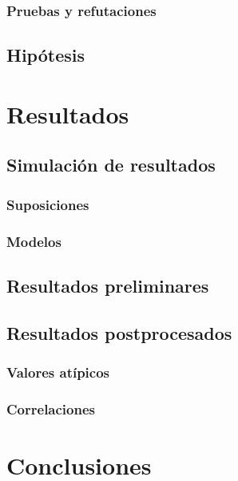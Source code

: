 \documentclass[12pt]{book}
\begin{document}
\subsection{Pruebas y refutaciones}
\section{Hipótesis}
\chapter{Resultados}
\section{Simulación de resultados}
\subsection{Suposiciones}
\subsection{Modelos}
\section{Resultados preliminares}
\section{Resultados postprocesados}
\subsection{Valores atípicos}
\subsection{Correlaciones}
\chapter{Conclusiones}
\end{document}
